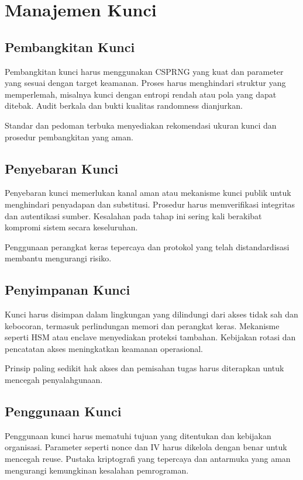 \documentclass[../main.tex]{subfiles}
\begin{document}
\chapter{Manajemen Kunci}

\section{Pembangkitan Kunci}
Pembangkitan kunci harus menggunakan CSPRNG yang kuat dan parameter yang sesuai dengan target keamanan. Proses harus menghindari struktur yang memperlemah, misalnya kunci dengan entropi rendah atau pola yang dapat ditebak. Audit berkala dan bukti kualitas randomness dianjurkan.

Standar dan pedoman terbuka menyediakan rekomendasi ukuran kunci dan prosedur pembangkitan yang aman.

\section{Penyebaran Kunci}
Penyebaran kunci memerlukan kanal aman atau mekanisme kunci publik untuk menghindari penyadapan dan substitusi. Prosedur harus memverifikasi integritas dan autentikasi sumber. Kesalahan pada tahap ini sering kali berakibat kompromi sistem secara keseluruhan.

Penggunaan perangkat keras tepercaya dan protokol yang telah distandardisasi membantu mengurangi risiko.

\section{Penyimpanan Kunci}
Kunci harus disimpan dalam lingkungan yang dilindungi dari akses tidak sah dan kebocoran, termasuk perlindungan memori dan perangkat keras. Mekanisme seperti HSM atau enclave menyediakan proteksi tambahan. Kebijakan rotasi dan pencatatan akses meningkatkan keamanan operasional.

Prinsip paling sedikit hak akses dan pemisahan tugas harus diterapkan untuk mencegah penyalahgunaan.

\section{Penggunaan Kunci}
Penggunaan kunci harus mematuhi tujuan yang ditentukan dan kebijakan organisasi. Parameter seperti nonce dan IV harus dikelola dengan benar untuk mencegah reuse. Pustaka kriptografi yang tepercaya dan antarmuka yang aman mengurangi kemungkinan kesalahan pemrograman.
\end{document}
